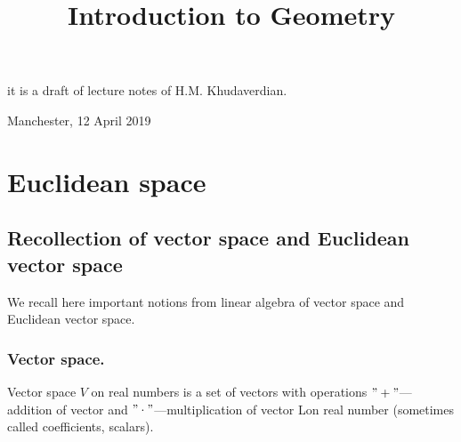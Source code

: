 \documentclass[12pt]{article}
\title{Introduction to  Geometry}
\date{}
\numberwithin{equation}{section}
\begin{document}
\maketitle

  \centerline {it is a draft of lecture notes of H.M. Khudaverdian.}

  \centerline { Manchester, 12 April 2019}

\tableofcontents
{}

\newpage
\section {Euclidean space}

\subsection{Recollection of vector space and Euclidean vector
space}

We recall here important notions from linear algebra
of vector space and Euclidean vector space.


\subsubsection {Vector space.}


\bigskip

Vector space $V$ on real numbers is a set of 
vectors with operations
$"+"$---addition of vector and 
$"\cdot"$---multiplication of vector
Lon real number (sometimes called coefficients, scalars). 

\m
\end{document}
